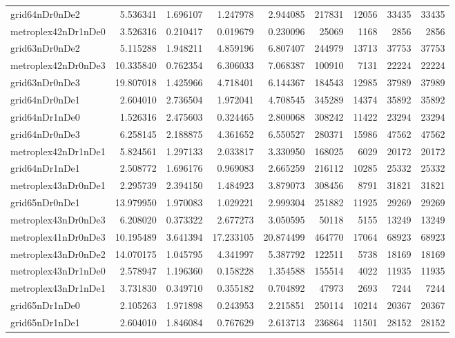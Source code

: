 \begin{longtable}{|l|r|r|r|r|r|r|r|r|}
grid64nDr0nDe2 & 5.536341 & 1.696107 & 1.247978 & 2.944085 & 217831 & 12056 & 33435 & 33435 \\
metroplex42nDr1nDe0 & 3.526316 & 0.210417 & 0.019679 & 0.230096 & 25069 & 1168 & 2856 & 2856 \\
grid63nDr0nDe2 & 5.115288 & 1.948211 & 4.859196 & 6.807407 & 244979 & 13713 & 37753 & 37753 \\
metroplex42nDr0nDe3 & 10.335840 & 0.762354 & 6.306033 & 7.068387 & 100910 & 7131 & 22224 & 22224 \\
grid63nDr0nDe3 & 19.807018 & 1.425966 & 4.718401 & 6.144367 & 184543 & 12985 & 37989 & 37989 \\
grid64nDr0nDe1 & 2.604010 & 2.736504 & 1.972041 & 4.708545 & 345289 & 14374 & 35892 & 35892 \\
grid64nDr1nDe0 & 1.526316 & 2.475603 & 0.324465 & 2.800068 & 308242 & 11422 & 23294 & 23294 \\
grid64nDr0nDe3 & 6.258145 & 2.188875 & 4.361652 & 6.550527 & 280371 & 15986 & 47562 & 47562 \\
metroplex42nDr1nDe1 & 5.824561 & 1.297133 & 2.033817 & 3.330950 & 168025 & 6029 & 20172 & 20172 \\
grid64nDr1nDe1 & 2.508772 & 1.696176 & 0.969083 & 2.665259 & 216112 & 10285 & 25332 & 25332 \\
metroplex43nDr0nDe1 & 2.295739 & 2.394150 & 1.484923 & 3.879073 & 308456 & 8791 & 31821 & 31821 \\
grid65nDr0nDe1 & 13.979950 & 1.970083 & 1.029221 & 2.999304 & 251882 & 11925 & 29269 & 29269 \\
metroplex43nDr0nDe3 & 6.208020 & 0.373322 & 2.677273 & 3.050595 & 50118 & 5155 & 13249 & 13249 \\
metroplex41nDr0nDe3 & 10.195489 & 3.641394 & 17.233105 & 20.874499 & 464770 & 17064 & 68923 & 68923 \\
metroplex43nDr0nDe2 & 14.070175 & 1.045795 & 4.341997 & 5.387792 & 122511 & 5738 & 18169 & 18169 \\
metroplex43nDr1nDe0 & 2.578947 & 1.196360 & 0.158228 & 1.354588 & 155514 & 4022 & 11935 & 11935 \\
metroplex43nDr1nDe1 & 3.731830 & 0.349710 & 0.355182 & 0.704892 & 47973 & 2693 & 7244 & 7244 \\
grid65nDr1nDe0 & 2.105263 & 1.971898 & 0.243953 & 2.215851 & 250114 & 10214 & 20367 & 20367 \\
grid65nDr1nDe1 & 2.604010 & 1.846084 & 0.767629 & 2.613713 & 236864 & 11501 & 28152 & 28152 \\

\end{longtable}
